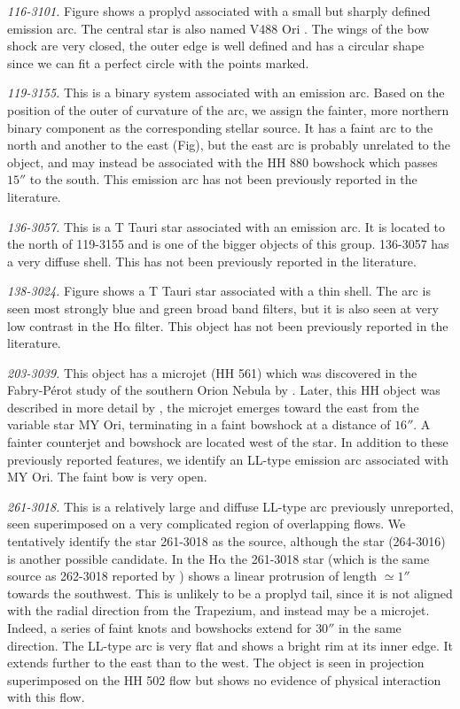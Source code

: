 \documentclass[iop, apj]{emulateapj}
\newcommand\ha{\ensuremath{\mathrm{H\alpha}}}
\begin{document}
\textit{116-3101.} Figure shows a proplyd associated with a small but sharply defined emission arc.  The central star is also named V488 Ori \citep{Bally:2006a}. The wings of the bow shock are very closed, the outer edge is well defined and has a circular shape since we can fit a perfect circle with the points marked.  

\textit{119-3155.} This is a binary system associated with an emission arc. Based on the position of the outer of curvature of the arc, we assign the fainter, more northern binary component as the corresponding stellar source. It has a faint arc to the north and another to the east (Fig), but  the east arc is probably unrelated to the object, and may instead be associated with the HH 880 bowshock which passes \(15''\) to the south. This emission arc has not been previously reported in the literature.     

\textit{136-3057.} This is a T Tauri star associated with an emission arc. It is located to the north of 119-3155 and is one of the bigger objects of this group. 136-3057 has a very diffuse shell. This has not been previously reported in the literature.

\textit{138-3024.} Figure shows a T Tauri star associated with a thin shell. The arc is seen most strongly blue and green broad band filters, but it is also seen at very low contrast in the \ha{} filter. This object has not been previously reported in the literature.

\textit{203-3039.} This object has a microjet (HH 561) which was discovered in the Fabry-Pérot study of the southern Orion Nebula by \citet{Bally:2001a}. Later, this HH object was described in more detail by \citet{Bally:2006a}, the microjet emerges toward the east from the variable star MY Ori, terminating in a faint bowshock at a distance of \(16''\). A fainter counterjet and bowshock are located west of the star. In addition to these previously reported features, we identify an LL-type emission arc associated with MY Ori. The faint bow is very open.

\textit{261-3018.} This is a relatively large and diffuse LL-type arc previously unreported, seen superimposed on a very complicated region of overlapping flows. We tentatively identify the star 261-3018 as the source, although the star (264-3016) is another possible candidate. In the \ha{} the 261-3018 star (which is the same source as 262-3018 reported by \citealp{Bally:2006a})  shows a linear protrusion of length \(\simeq1''\) towards the southwest. This is unlikely to be a proplyd tail, since it is not aligned with the radial direction from the Trapezium, and instead may be a microjet. Indeed, a series of faint knots and bowshocks extend for \(30''\) in the same direction. The LL-type arc is very flat and shows a bright rim at its inner edge. It extends further to the east than to the west. The object is seen in projection superimposed on the HH 502 flow but shows no evidence of physical interaction with this flow.
\end{document}
